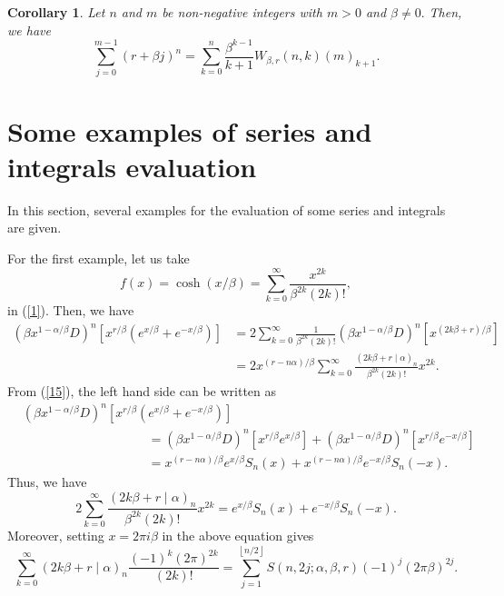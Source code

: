 \documentclass{article}%
\newtheorem{corollary}[theorem]{Corollary}
\begin{document}
\begin{corollary}
Let $n$ and $m$ be non-negative integers with $m>0$ and $\beta\neq0.$ Then, we
have%
\[
\sum_{j=0}^{m-1}\left(  r+\beta j\right)  ^{n}=\sum_{k=0}^{n}\frac{\beta
^{k-1}}{k+1}W_{\beta,r}\left(  n,k\right)  \left(  m\right)  _{k+1}.
\]

\end{corollary}

\section{Some examples of series and integrals evaluation}

In this section, several examples for the evaluation of some series and
integrals are given.

For the first example, let us take
\[
f\left(  x\right)  =\cosh\left(  x/\beta\right)  =\sum_{k=0}^{\infty}%
\frac{x^{2k}}{\beta^{2k}\left(  2k\right)  !},
\]
in (\ref{1}). Then, we have%
\begin{align*}
\left(  \beta x^{1-\alpha/\beta}D\right)  ^{n}\left[  x^{r/\beta}\left(
e^{x/\beta}+e^{-x/\beta}\right)  \right]   &  =2\sum_{k=0}^{\infty}\frac
{1}{\beta^{2k}\left(  2k\right)  !}\left(  \beta x^{1-\alpha/\beta}D\right)
^{n}\left[  x^{\left(  2k\beta+r\right)  /\beta}\right] \\
&  =2x^{\left(  r-n\alpha\right)  /\beta}\sum_{k=0}^{\infty}\frac{\left(
2k\beta+r\mid\alpha\right)  _{n}}{\beta^{2k}\left(  2k\right)  !}x^{2k}.
\end{align*}
From (\ref{15}), the left hand side can be written as
\begin{align*}
&  \left(  \beta x^{1-\alpha/\beta}D\right)  ^{n}\left[  x^{r/\beta}\left(
e^{x/\beta}+e^{-x/\beta}\right)  \right] \\
&  ^{\qquad\qquad\qquad\qquad\qquad\qquad\qquad}=\left(  \beta x^{1-\alpha
/\beta}D\right)  ^{n}\left[  x^{r/\beta}e^{x/\beta}\right]  +\left(  \beta
x^{1-\alpha/\beta}D\right)  ^{n}\left[  x^{r/\beta}e^{-x/\beta}\right] \\
&  ^{\qquad\qquad\qquad\qquad\qquad\qquad\qquad}=x^{\left(  r-n\alpha\right)
/\beta}e^{x/\beta}S_{n}\left(  x\right)  +x^{\left(  r-n\alpha\right)  /\beta
}e^{-x/\beta}S_{n}\left(  -x\right)  .
\end{align*}
Thus, we have
\[
2\sum_{k=0}^{\infty}\frac{\left(  2k\beta+r\mid\alpha\right)  _{n}}{\beta
^{2k}\left(  2k\right)  !}x^{2k}=e^{x/\beta}S_{n}\left(  x\right)
+e^{-x/\beta}S_{n}\left(  -x\right)  .
\]
Moreover, setting $x=2\pi i\beta$ in the above equation gives%
\begin{equation}
\sum_{k=0}^{\infty}\left(  2k\beta+r\mid\alpha\right)  _{n}\frac{\left(
-1\right)  ^{k}\left(  2\pi\right)  ^{2k}}{\left(  2k\right)  !}=\sum
_{j=1}^{\left\lfloor n/2\right\rfloor }S\left(  n,2j;\alpha,\beta,r\right)
\left(  -1\right)  ^{j}\left(  2\pi\beta\right)  ^{2j}. \label{17}%
\end{equation}
\end{document}
